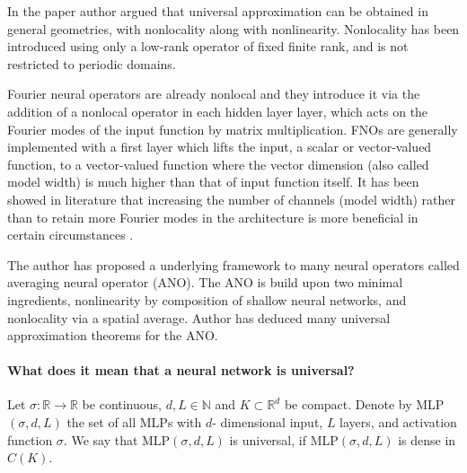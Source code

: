 \documentclass[reqno]{amsart}
\theoremstyle{plain}
\theoremstyle{definition}
\newcommand{\bb}[1]{\mathbb{#1}}
\begin{document}
\noindent In the paper author argued that universal approximation can be obtained in general geometries, with nonlocality along with nonlinearity. Nonlocality has been introduced using only a low-rank operator of fixed finite rank, and is not restricted to periodic domains.

\noindent Fourier neural operators are already nonlocal and they introduce it via the addition of a nonlocal operator in each hidden layer layer, which acts on the Fourier modes of the input function by matrix multiplication. FNOs are generally implemented with a first layer which lifts the input, a scalar or vector-valued function, to a vector-valued function where the vector dimension (also called model width) is much higher than that of input function itself. It has been showed in literature that increasing the number of channels (model width) rather than to retain more Fourier modes in the architecture is more beneficial in certain circumstances \cite{SL2022}.

\noindent The author has proposed a underlying framework to many neural operators called averaging neural operator (ANO). The ANO is build upon two minimal ingredients, nonlinearity by composition of shallow neural networks, and nonlocality via a spatial average. Author has deduced many universal approximation theorems for the ANO.

\paragraph{\bf What does it mean that a neural network is universal?} Let $\sigma:\bb R \to \bb R$ be continuous, $d,L \in \bb N$ and $K \subset \bb R^d$ be compact. Denote by MLP$(\sigma, d, L)$ the set of all MLPs with $d$- dimensional input, $L$ layers, and activation function $\sigma$. We say that MLP$(\sigma, d, L)$ is universal, if MLP$(\sigma, d,L)$ is dense in $C(K)$.
\end{document}

